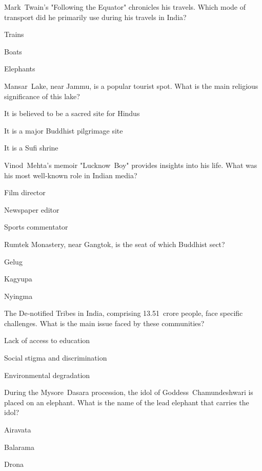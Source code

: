 \begin{enhancedmcq}{Mark Twain's "Following the Equator" chronicles his travels. Which mode of transport did he primarily use during his travels in India?}
\item Trains
\item Boats
\item Elephants

\end{enhancedmcq}
\begin{enhancedmcq}{Mansar Lake, near Jammu, is a popular tourist spot. What is the main religious significance of this lake?}
\item It is believed to be a sacred site for Hindus
\item It is a major Buddhist pilgrimage site
\item It is a Sufi shrine

\end{enhancedmcq}
\begin{enhancedmcq}{Vinod Mehta's memoir "Lucknow Boy" provides insights into his life. What was his most well‑known role in Indian media?}
\item Film director
\item Newspaper editor
\item Sports commentator

\end{enhancedmcq}
\begin{enhancedmcq}{Rumtek Monastery, near Gangtok, is the seat of which Buddhist sect?}
\item Gelug
\item Kagyupa
\item Nyingma

\end{enhancedmcq}
\begin{enhancedmcq}{The De‑notified Tribes in India, comprising 13.51 crore people, face specific challenges. What is the main issue faced by these communities?}
\item Lack of access to education
\item Social stigma and discrimination
\item Environmental degradation

\end{enhancedmcq}
\begin{enhancedmcq}{During the Mysore Dasara procession, the idol of Goddess Chamundeshwari is placed on an elephant. What is the name of the lead elephant that carries the idol?}
\item Airavata
\item Balarama
\item Drona

\end{enhancedmcq}
